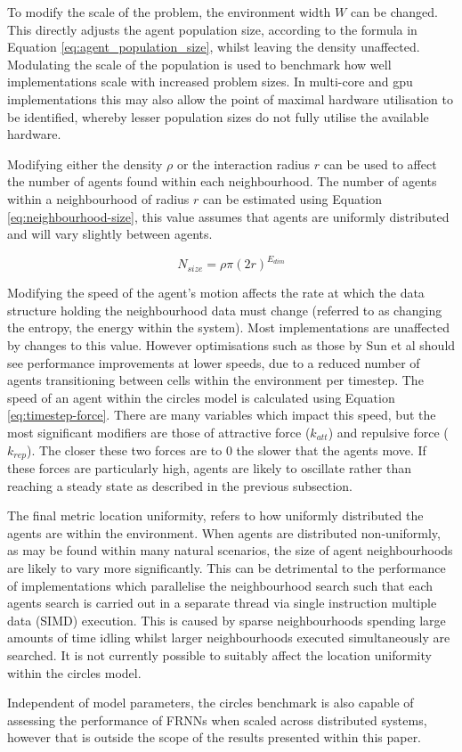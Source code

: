     To modify the scale of the problem, the environment width $W$ can be changed. This directly adjusts the agent population size, according to the formula in Equation \ref{eq:agent_population_size}, whilst leaving the density unaffected. Modulating the scale of the population is used to benchmark how well implementations scale with increased problem sizes. In multi-core and \gls{gpu} implementations this may also allow the point of maximal hardware utilisation to be identified, whereby lesser population sizes do not fully utilise the available hardware.
    
    Modifying either the density $\rho$ or the interaction radius $r$ can be used to affect the number of agents found within each neighbourhood. The number of agents within a neighbourhood of radius $r$ can be estimated using Equation \ref{eq:neighbourhood-size}, this value assumes that agents are uniformly distributed and will vary slightly between agents.
    
    \begin{equation}\label{eq:neighbourhood-size}
        N_{size} = \rho \pi (2r)^{E_{dim}}
    \end{equation}
      
    Modifying the speed of the agent's motion affects the rate at which the data structure holding the neighbourhood data must change (referred to as changing the entropy, the energy within the system). Most implementations are unaffected by changes to this value. However optimisations such as those by Sun et al \cite{HY*15} should see performance improvements at lower speeds, due to a reduced number of agents transitioning between cells within the environment per timestep. The speed of an agent within the circles model is calculated using Equation \ref{eq:timestep-force}. There are many variables which impact this speed, but the most significant modifiers are those of attractive force ($k_{att}$) and repulsive force ($k_{rep}$). The closer these two forces are to $0$ the slower that the agents move. If these forces are particularly high, agents are likely to oscillate rather than reaching a steady state as described in the previous subsection.
    
    The final metric location uniformity, refers to how uniformly distributed the agents are within the environment. When agents are distributed non-uniformly, as may be found within many natural scenarios, the size of agent neighbourhoods are likely to vary more significantly. This can be detrimental to the performance of implementations which parallelise the neighbourhood search such that each agents search is carried out in a separate thread via single instruction multiple data (SIMD) execution. This is caused by sparse neighbourhoods spending large amounts of time idling whilst larger neighbourhoods executed simultaneously are searched. It is not currently possible to suitably affect the location uniformity within the circles model.
    
    Independent of model parameters, the circles benchmark is also capable of assessing the performance of FRNNs when scaled across distributed systems, however that is outside the scope of the results presented within this paper.